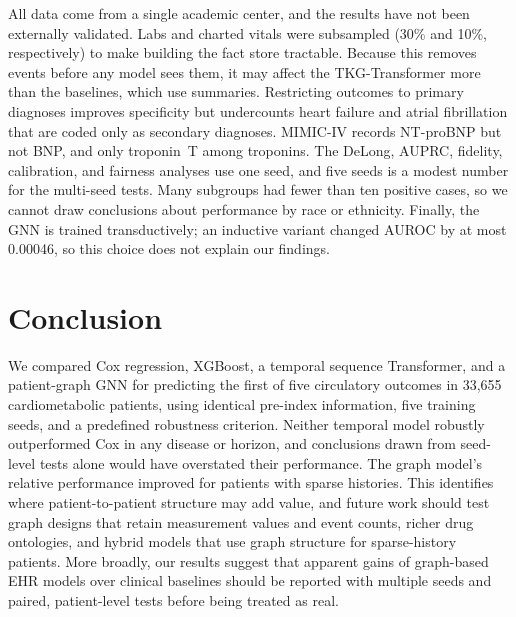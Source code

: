 All data come from a single academic center, and the results have not been externally validated. Labs and charted vitals were subsampled (30\% and 10\%, respectively) to make building the fact store tractable. Because this removes events before any model sees them, it may affect the TKG-Transformer more than the baselines, which use summaries. Restricting outcomes to primary diagnoses improves specificity but undercounts heart failure and atrial fibrillation that are coded only as secondary diagnoses. MIMIC-IV records NT-proBNP but not BNP, and only troponin~T among troponins. The DeLong, AUPRC, fidelity, calibration, and fairness analyses use one seed, and five seeds is a modest number for the multi-seed tests. Many subgroups had fewer than ten positive cases, so we cannot draw conclusions about performance by race or ethnicity. Finally, the GNN is trained transductively; an inductive variant changed AUROC by at most 0.00046, so this choice does not explain our findings.

\section{Conclusion}
\label{sec:conclusion}

We compared Cox regression, XGBoost, a temporal sequence Transformer, and a patient-graph GNN for predicting the first of five circulatory outcomes in 33,655 cardiometabolic patients, using identical pre-index information, five training seeds, and a predefined robustness criterion. Neither temporal model robustly outperformed Cox in any disease or horizon, and conclusions drawn from seed-level tests alone would have overstated their performance. The graph model's relative performance improved for patients with sparse histories. This identifies where patient-to-patient structure may add value, and future work should test graph designs that retain measurement values and event counts, richer drug ontologies, and hybrid models that use graph structure for sparse-history patients. More broadly, our results suggest that apparent gains of graph-based EHR models over clinical baselines should be reported with multiple seeds and paired, patient-level tests before being treated as real.
